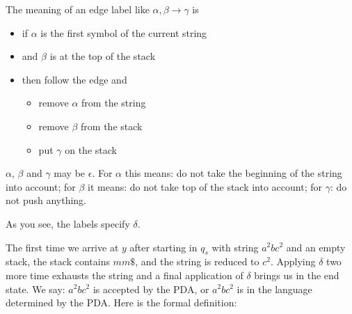 The meaning of an edge label like $\alpha,\beta \rightarrow \gamma$ is

\begin{itemize}
\item if $\alpha$ is the first symbol of the current string
\item and $\beta$ is at the top of the stack
\item then follow the edge and
\begin{itemize}
\item remove $\alpha$ from the string
\item remove $\beta$ from the stack
\item put $\gamma$ on the stack
\end{itemize}

\end{itemize}

$\alpha$, $\beta$ and $\gamma$ may be $\epsilon$. For $\alpha$ this
means: do not take the beginning of the string into account; for
$\beta$ it means: do not take top of the stack into account; for
$\gamma$: do not push anything.

As you see, the labels specify $\delta$.

The first time we arrive at $y$ after starting in $q_s$ with string
$a^2bc^2$ and an empty stack, the stack contains $mm\$$, and the string
is reduced to $c^2$. Applying $\delta$ two more time exhausts the
string and a final application of $\delta$ brings us in the end
state. We say: $a^2bc^2$ is accepted by the PDA, or $a^2bc^2$ is in
the language determined by the PDA. Here is the formal definition:


